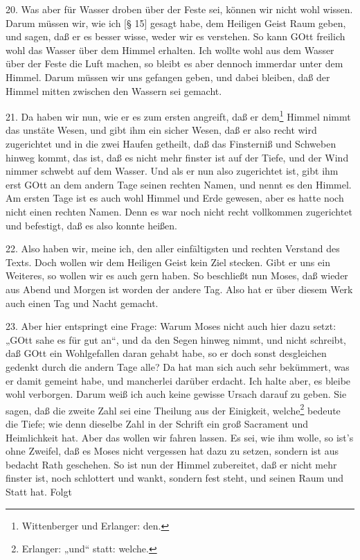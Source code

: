 20. Was aber für Wasser droben über der Feste sei, können wir nicht wohl wissen. Darum müssen wir, wie ich [§ 15] gesagt habe, dem Heiligen Geist Raum geben, und sagen, daß er es besser wisse, weder wir es verstehen. So kann GOtt freilich wohl das Wasser über dem Himmel erhalten. Ich wollte wohl aus dem Wasser über der Feste die Luft machen, so bleibt es aber dennoch immerdar unter dem Himmel. Darum müssen wir uns gefangen geben, und dabei bleiben, daß der Himmel mitten zwischen den Wassern sei gemacht.

21. Da haben wir nun, wie er es zum ersten angreift, daß er dem\footnote{Wittenberger und Erlanger: den.} Himmel nimmt das unstäte Wesen, und gibt ihm ein sicher Wesen, daß er also recht wird zugerichtet und in die zwei Haufen getheilt, daß das Finsterniß und Schweben hinweg kommt, das ist, daß es nicht mehr finster ist auf der Tiefe, und der Wind nimmer schwebt auf dem Wasser. Und als er nun also zugerichtet ist, gibt ihm erst GOtt an dem andern Tage seinen rechten Namen, und nennt es den Himmel. Am ersten Tage ist es auch wohl Himmel und Erde gewesen, aber es hatte noch nicht einen rechten Namen. Denn es war noch nicht recht vollkommen zugerichtet und befestigt, daß es also konnte heißen.

22. Also haben wir, meine ich, den aller einfältigsten und rechten Verstand des Texts. Doch wollen wir dem Heiligen Geist kein Ziel stecken. Gibt er uns ein Weiteres, so wollen wir es auch gern haben. So beschließt nun Moses, daß wieder aus Abend und Morgen ist worden der andere Tag. Also hat er über diesem Werk auch einen Tag und Nacht gemacht.

23. Aber hier entspringt eine Frage: Warum Moses nicht auch hier dazu setzt: „GOtt sahe es für gut an“, und da den Segen hinweg nimmt, und nicht schreibt, daß GOtt ein Wohlgefallen daran gehabt habe, so er doch sonst desgleichen gedenkt durch die andern Tage alle? Da hat man sich auch sehr bekümmert, was er damit gemeint habe, und mancherlei darüber erdacht. Ich halte aber, es bleibe wohl verborgen. Darum weiß ich auch keine gewisse Ursach darauf zu geben. Sie sagen, daß die zweite Zahl sei eine Theilung aus der Einigkeit, welche\footnote{Erlanger: „und“ statt: welche.} bedeute die Tiefe; wie denn dieselbe Zahl in der Schrift ein groß Sacrament und Heimlichkeit hat. Aber das wollen wir fahren lassen. Es sei, wie ihm wolle, so ist’s ohne Zweifel, daß es Moses nicht vergessen hat dazu zu setzen, sondern ist aus bedacht Rath geschehen. So ist nun der Himmel zubereitet, daß er nicht mehr finster ist, noch schlottert und wankt, sondern fest steht, und seinen Raum und Statt hat. Folgt

